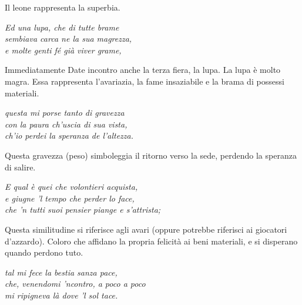 \documentclass[a4paper]{article}
\begin{document}
Il leone rappresenta la superbia.

\begin{center}
    \textit{Ed una lupa, che di tutte brame} \\
    \textit{sembiava carca ne la sua magrezza,} \\
    \textit{e molte genti fé già viver grame,}
\end{center}

Immediatamente Date incontro anche la terza fiera, la lupa.
La lupa è molto magra. Essa rappresenta l'avariazia, la fame insaziabile e la brama di possessi materiali.

\begin{center}
    \textit{questa mi porse tanto di gravezza} \\
    \textit{con la paura ch'uscia di sua vista,} \\
    \textit{ch'io perdei la speranza de l'altezza.}
\end{center}

Questa gravezza (peso) simboleggia il ritorno verso la sede, perdendo la speranza di salire.


\begin{center}
    \textit{E qual è quei che volontieri acquista,} \\
    \textit{e giugne 'l tempo che perder lo face,} \\
    \textit{che 'n tutti suoi pensier piange e s'attrista;}
\end{center}

Questa similitudine si riferisce agli avari (oppure potrebbe riferisci ai giocatori d'azzardo).
Coloro che affidano la propria felicità ai beni materiali, e si disperano quando perdono tuto.


\begin{center}
    \textit{tal mi fece la bestia sanza pace,} \\
    \textit{che, venendomi 'ncontro, a poco a poco} \\
    \textit{mi ripigneva là dove 'l sol tace.}
\end{center}
\end{document}
